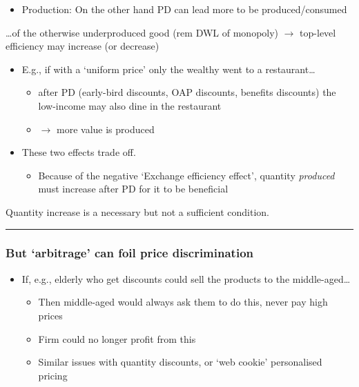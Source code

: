 \documentclass[]{article}
\providecommand{\tightlist}{%
  \setlength{\itemsep}{0pt}\setlength{\parskip}{0pt}}
\begin{document}
\begin{itemize}
\tightlist
\item
  Production: On the other hand PD can lead more to be produced/consumed
\end{itemize}

\ldots of the otherwise underproduced good (rem DWL of monopoly)
\(\rightarrow\) top-level efficiency may increase (or decrease)

\begin{itemize}
\tightlist
\item
  E.g., if with a `uniform price' only the wealthy went to a
  restaurant\ldots{}

  \begin{itemize}
  \tightlist
  \item
    after PD (early-bird discounts, OAP discounts, benefits discounts)
    the low-income may also dine in the restaurant
  \item
    \(\rightarrow\) more value is produced
  \end{itemize}
\item
  These two effects trade off.

  \begin{itemize}
  \tightlist
  \item
    Because of the negative `Exchange efficiency effect', quantity
    \emph{produced} must increase after PD for it to be beneficial
  \end{itemize}
\end{itemize}

Quantity increase is a necessary but not a sufficient condition.

\begin{center}\rule{0.5\linewidth}{\linethickness}\end{center}

\hypertarget{but-arbitrage-can-foil-price-discrimination}{%
\subsubsection{But `arbitrage' can foil price
discrimination}\label{but-arbitrage-can-foil-price-discrimination}}

\begin{itemize}
\tightlist
\item
  If, e.g., elderly who get discounts could sell the products to the
  middle-aged\ldots{}

  \begin{itemize}
  \tightlist
  \item
    Then middle-aged would always ask them to do this, never pay high
    prices
  \item
    Firm could no longer profit from this
  \item
    Similar issues with quantity discounts, or `web cookie' personalised
    pricing
  \end{itemize}
\end{itemize}
\end{document}
